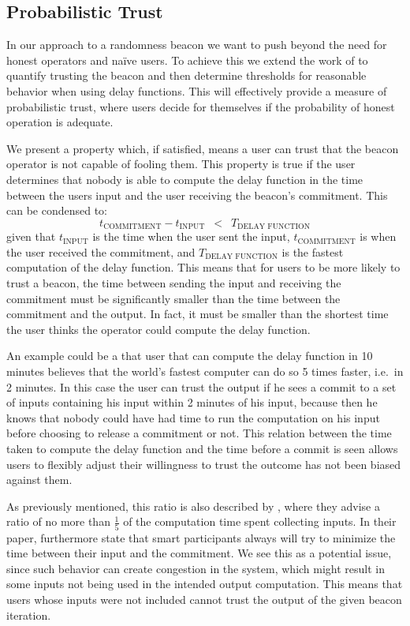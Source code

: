 \subsection{Probabilistic Trust}%
\label{sub:probabilistic_trust}
In our approach to a randomness beacon we want to push beyond the need for honest operators and naïve users.
To achieve this we extend the work of \citet{randomzoo} to quantify trusting the beacon and then determine thresholds for reasonable behavior when using delay functions.
This will effectively provide a measure of probabilistic trust, where users decide for themselves if the probability of honest operation is adequate.

We present a property which, if satisfied, means a user can trust that the beacon operator is not capable of fooling them.
This property is true if the user determines that nobody is able to compute the delay function in the time between the users input and the user receiving the beacon's commitment.
This can be condensed to:
\begin{equation*}
    t_\text{COMMITMENT} - t_\text{INPUT}\enspace <\enspace T_\text{DELAY FUNCTION}
\end{equation*}
given that $t_\text{INPUT}$ is the time when the user sent the input, $t_\text{COMMITMENT}$ is when the user received the commitment, and $T_\text{DELAY FUNCTION}$ is the fastest computation of the delay function.
This means that for users to be more likely to trust a beacon, the time between sending the input and receiving the commitment must be significantly smaller than the time between the commitment and the output.
In fact, it must be smaller than the shortest time the user thinks the operator could compute the delay function.

An example could be a that user that can compute the delay function in 10 minutes believes that the world's fastest computer can do so 5 times faster, i.e.\ in 2 minutes. In this case the user can trust the output if he sees a commit to a set of inputs containing his input within 2 minutes of his input, because then he knows that nobody could have had time to run the computation on his input before choosing to release a commitment or not.
This relation between the time taken to compute the delay function and the time before a commit is seen allows users to flexibly adjust their willingness to trust the outcome has not been biased against them.

As previously mentioned, this ratio is also described by \citet{randomzoo}, where they advise a ratio of no more than $\frac{1}{5}$ of the computation time spent collecting inputs.
In their paper, \citeauthor{randomzoo} furthermore state that smart participants always will try to minimize the time between their input and the commitment.
We see this as a potential issue, since such behavior can create congestion in the system, which might result in some inputs not being used in the intended output computation.
This means that users whose inputs were not included cannot trust the output of the given beacon iteration.

